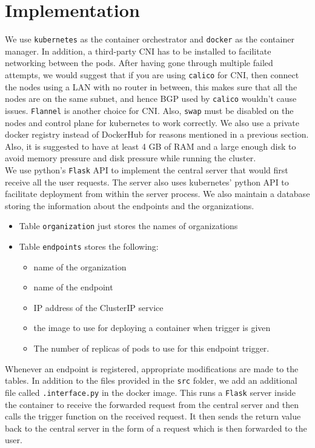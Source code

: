 \documentclass{article}
\begin{document}
\section{Implementation}
We use \texttt{kubernetes} as the container orchestrator and \texttt{docker} as the container manager. In addition, a third-party CNI has to be installed to facilitate networking between the pods. After having gone through multiple failed attempts, we would suggest that if you are using \texttt{calico} for CNI, then connect the nodes using a LAN with no router in between, this makes sure that all the nodes are on the same subnet, and hence BGP used by \texttt{calico} wouldn't cause issues. \texttt{Flannel} is another choice for CNI. Also, \texttt{swap} must be disabled on the nodes and control plane for kubernetes to work correctly. We also use a private docker registry instead of DockerHub for reasons mentioned in a previous section. Also, it is suggested to have at least 4 GB of RAM and a large enough disk to avoid memory pressure and disk pressure while running the cluster. \\
We use python's \texttt{Flask} API to implement the central server that would first receive all the user requests. The server also uses kubernetes' python API to facilitate deployment from within the server process. We also maintain a database storing the information about the endpoints and the organizations.
\begin{itemize}
    \item Table \texttt{organization} just stores the names of organizations
    \item Table \texttt{endpoints} stores the following:
    \begin{itemize}
        \item name of the organization
        \item name of the endpoint
        \item IP address of the ClusterIP service
        \item the image to use for deploying a container when trigger is given
        \item The number of replicas of pods to use for this endpoint trigger.
    \end{itemize}
\end{itemize}
Whenever an endpoint is registered, appropriate modifications are made to the tables. In addition to the files provided in the \texttt{src} folder, we add an additional file called \texttt{.interface.py} in the docker image. This runs a \texttt{Flask} server inside the container to receive the forwarded request from the central server and then calls the trigger function on the received request. It then sends the return value back to the central server in the form of a request which is then forwarded to the user. 
\end{document}

